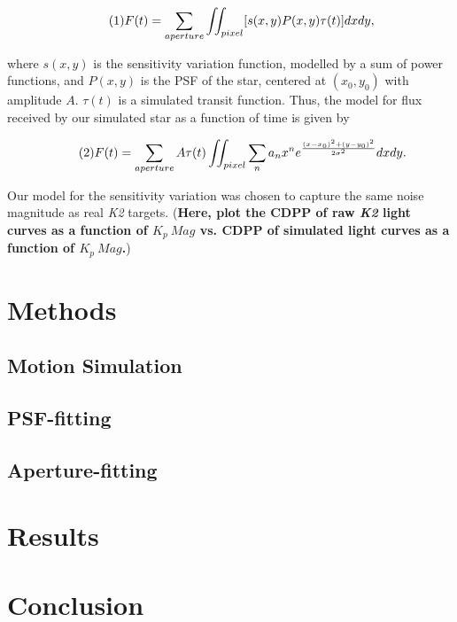 \documentclass[12pt,preprint]{aastex}
\begin{document}
\[
\tag{1}
F(t) = \sum_{aperture} \iint_{pixel} [s(x,y)P(x,y)\tau(t)] dxdy,\\
\]

where $s(x,y)$ is the sensitivity variation function, modelled by a sum of power functions, and $P(x,y)$ is the PSF of the star, centered at $(x_0,y_0)$ with amplitude $A$. $\tau (t)$ is a simulated transit function. Thus, the model for flux received by our simulated star as a function of time is given by

\[ 
\tag{2}
F(t) = \sum_{aperture} A\tau(t) \iint_{pixel} \sum_n a_n x^n e^{\frac{\left(x-x_0 \right)^2+\left( y-y_0 \right)^2}{2\sigma^2}} dxdy. \\
\]

Our model for the sensitivity variation was chosen to capture the same noise magnitude as real \textit{K2} targets. (\textbf{Here, plot the CDPP of raw \textit{K2} light curves as a function of $K_p\ Mag$ vs. CDPP of simulated light curves as a function of $K_p\ Mag$.})

\section{Methods}

\subsection{Motion Simulation}

\subsection{PSF-fitting}

\subsection{Aperture-fitting}

\section{Results}

\section{Conclusion}

\clearpage


\end{document}
